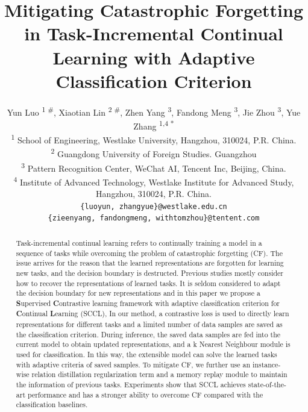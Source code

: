 \documentclass[11pt]{article}
\title{Mitigating Catastrophic Forgetting in Task-Incremental Continual Learning with Adaptive Classification Criterion}
\author{
    Yun Luo  \textsuperscript{\rm1 $\#$},
    Xiaotian  Lin  \textsuperscript{\rm2 $\#$},
    Zhen Yang \textsuperscript{\rm3},
    Fandong Meng \textsuperscript{\rm3},
    Jie Zhou  \textsuperscript{\rm3},
    Yue Zhang \textsuperscript{\rm1,4   *}
    \\
    \textsuperscript{1} School of Engineering, Westlake University, Hangzhou, 310024, P.R. China. \\
        \textsuperscript{2} Guangdong University of Foreign Studies. Guangzhou  \\
    \textsuperscript{3} Pattern Recognition Center, WeChat AI, Tencent Inc, Beijing, China.  \\
    \textsuperscript{4} Institute of Advanced Technology, Westlake Institute for Advanced Study, Hangzhou, 310024, P.R. China.  \\
    \texttt{\{luoyun, zhangyue\}@westlake.edu.cn}\\
    \texttt{\{zieenyang, fandongmeng, withtomzhou\}@tentent.com}
}
\begin{document}
\maketitle
\begin{abstract}
Task-incremental continual learning refers to continually training a model in a sequence of tasks while overcoming the problem of catastrophic forgetting (CF). The issue arrives for the reason that the learned representations are forgotten for learning new tasks, and the decision boundary is destructed.  Previous studies mostly consider how to recover the representations of learned tasks. It is seldom considered to adapt the decision boundary for new representations  and in this paper we propose a \textbf{S}upervised \textbf{C}ontrastive learning framework with adaptive classification criterion for \textbf{C}ontinual \textbf{L}earning (SCCL), In our method, a contrastive loss is used to directly learn representations for different tasks and a limited number of data samples are saved as the classification criterion. During inference, the saved data samples are fed into the current model to obtain updated representations, and a k Nearest Neighbour module is used for classification. In this way, the extensible model can solve the learned tasks with adaptive criteria of saved samples.  To mitigate CF, we further use an instance-wise relation distillation regularization term and a memory replay module to maintain the information of previous tasks. Experiments show that SCCL achieves state-of-the-art performance and has a stronger ability to overcome CF compared with the classification baselines. 
\end{abstract}


\end{document}
